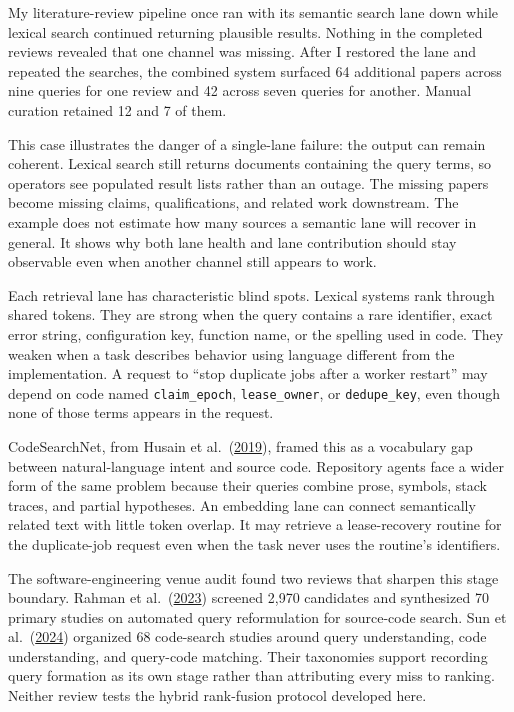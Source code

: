 My literature-review pipeline once ran with its semantic search lane down while lexical search continued returning plausible results. Nothing in the completed reviews revealed that one channel was missing. After I restored the lane and repeated the searches, the combined system surfaced 64 additional papers across nine queries for one review and 42 across seven queries for another. Manual curation retained 12 and 7 of them.

This case illustrates the danger of a single-lane failure: the output can remain coherent. Lexical search still returns documents containing the query terms, so operators see populated result lists rather than an outage. The missing papers become missing claims, qualifications, and related work downstream. The example does not estimate how many sources a semantic lane will recover in general. It shows why both lane health and lane contribution should stay observable even when another channel still appears to work.

Each retrieval lane has characteristic blind spots. Lexical systems rank through shared tokens. They are strong when the query contains a rare identifier, exact error string, configuration key, function name, or the spelling used in code. They weaken when a task describes behavior using language different from the implementation. A request to ``stop duplicate jobs after a worker restart'' may depend on code named \texttt{claim\_epoch}, \texttt{lease\_owner}, or \texttt{dedupe\_key}, even though none of those terms appears in the request.

CodeSearchNet, from Husain et al.~(\href{https://arxiv.org/abs/1909.09436}{2019}), framed this as a vocabulary gap between natural-language intent and source code. Repository agents face a wider form of the same problem because their queries combine prose, symbols, stack traces, and partial hypotheses. An embedding lane can connect semantically related text with little token overlap. It may retrieve a lease-recovery routine for the duplicate-job request even when the task never uses the routine's identifiers.

The software-engineering venue audit found two reviews that sharpen this stage boundary. Rahman et al.~(\href{https://doi.org/10.1145/3607179}{2023}) screened 2,970 candidates and synthesized 70 primary studies on automated query reformulation for source-code search. Sun et al.~(\href{https://doi.org/10.1145/3656341}{2024}) organized 68 code-search studies around query understanding, code understanding, and query-code matching. Their taxonomies support recording query formation as its own stage rather than attributing every miss to ranking. Neither review tests the hybrid rank-fusion protocol developed here.

